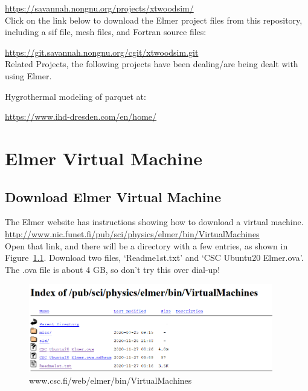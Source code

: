     \url{https://savannah.nongnu.org/projects/xtwoodsim/}\\

Click on the link below to download the Elmer project files from this repository, including a sif file, mesh files, and Fortran source files:

\url{https://git.savannah.nongnu.org/cgit/xtwoodsim.git}\\

\noindent Related Projects, the following projects have been dealing/are being dealt with using Elmer.

    Hygrothermal modeling of parquet at:

\url{https://www.ihd-dresden.com/en/home/}


\chapter{Elmer Virtual Machine}

\section{Download Elmer Virtual Machine}

The Elmer website has instructions showing how to download a virtual machine.\\

 \url{http://www.nic.funet.fi/pub/sci/physics/elmer/bin/VirtualMachines}\\

Open that link, and there will be a directory with a few entries, as shown in Figure~\ref{fg:virt-1}.  Download two files, `Readme1st.txt' and  `CSC Ubuntu20 Elmer.ova'.  The .ova file is about 4 GB, so don't try this over dial-up!\\

\begin{figure}[H]
\begin{center}
\includegraphics[width=0.95\textwidth]{virt-1}
\caption{www.csc.fi/web/elmer/bin/VirtualMachines}\label{fg:virt-1}
\end{center}
\end{figure}

